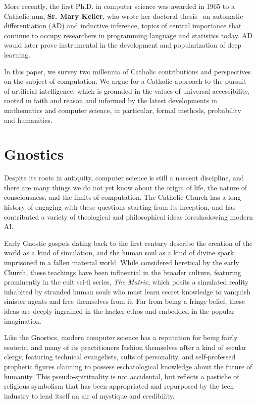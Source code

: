 \documentclass[sigplan,nonacm]{acmart}\settopmatter{printfolios=false,printccs=false,printacmref=false}
\begin{document}
  More recently, the first Ph.D. in computer science was awarded in 1965 to a Catholic nun, \textbf{Sr. Mary Keller}, who wrote her doctoral thesis~\cite{keller1965inductive} on automatic differentiation (AD) and inductive inference, topics of central importance that continue to occupy researchers in programming language and statistics today. AD would later prove instrumental in the development and popularization of deep learning.

  In this paper, we survey two millennia of Catholic contributions and perspectives on the subject of computation. We argue for a Catholic approach to the pursuit of artificial intelligence, which is grounded in the values of universal accessibility, rooted in faith and reason and informed by the latest developments in mathematics and computer science, in particular, formal methods, probability and humanities.

 \section{Gnostics}

  Despite its roots in antiquity, computer science is still a nascent discipline, and there are many things we do not yet know about the origin of life, the nature of consciousness, and the limits of computation. The Catholic Church has a long history of engaging with these questions starting from its inception, and has contributed a variety of theological and philosophical ideas foreshadowing modern AI.

  Early Gnostic gospels dating back to the first century describe the creation of the world as a kind of simulation, and the human soul as a kind of divine spark imprisoned in a fallen material world. While considered heretical by the early Church, these teachings have been influential in the broader culture, featuring prominently in the cult sci-fi series, \textit{The Matrix}, which posits a simulated reality inhabited by stranded human souls who must learn secret knowledge to vanquish sinister agents and free themselves from it. Far from being a fringe belief, these ideas are deeply ingrained in the hacker ethos and embedded in the popular imagination.

  Like the Gnostics, modern computer science has a reputation for being fairly esoteric, and many of its practitioners fashion themselves after a kind of secular clergy, featuring technical evangelists, cults of personality, and self-professed prophetic figures claiming to possess eschatological knowledge about the future of humanity. This pseudo-spirituality is not accidental, but reflects a pastiche of religious symbolism that has been appropriated and repurposed by the tech industry to lend itself an air of mystique and credibility.
\end{document}

